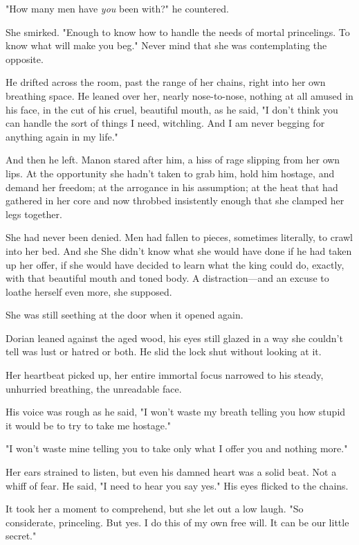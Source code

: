 "How many men have \emph{you} been with?" he countered.

She smirked. "Enough to know how to handle the needs of mortal princelings. To know what will make you beg." Never mind that she was contemplating the opposite.

He drifted across the room, past the range of her chains, right into her own breathing space. He leaned over her, nearly nose-to-nose, nothing at all amused in his face, in the cut of his cruel, beautiful mouth, as he said, "I don't think you can handle the sort of things I need, witchling. And I am never begging for anything again in my life."

And then he left. Manon stared after him, a hiss of rage slipping from her own lips. At the opportunity she hadn't taken to grab him, hold him hostage, and demand her freedom; at the arrogance in his assumption; at the heat that had gathered in her core and now throbbed insistently enough that she clamped her legs together.

She had never been denied. Men had fallen to pieces, sometimes literally, to crawl into her bed. And she  She didn't know what she would have done if he had taken up her offer, if she would have decided to learn what the king could do, exactly, with that beautiful mouth and toned body. A distraction---and an excuse to loathe herself even more, she supposed.

She was still seething at the door when it opened again.

Dorian leaned against the aged wood, his eyes still glazed in a way she couldn't tell was lust or hatred or both. He slid the lock shut without looking at it.

Her heartbeat picked up, her entire immortal focus narrowed to his steady, unhurried breathing, the unreadable face.

His voice was rough as he said, "I won't waste my breath telling you how stupid it would be to try to take me hostage."

"I won't waste mine telling you to take only what I offer you and nothing more."

Her ears strained to listen, but even his damned heart was a solid beat. Not a whiff of fear. He said, "I need to hear you say yes." His eyes flicked to the chains.

It took her a moment to comprehend, but she let out a low laugh. "So considerate, princeling. But yes. I do this of my own free will. It can be our little secret."

